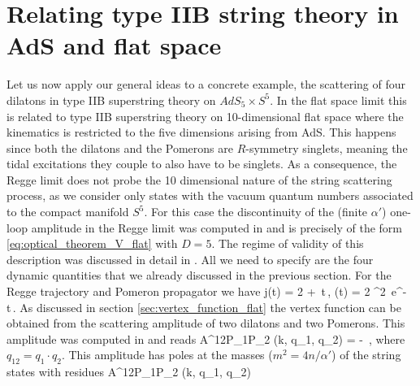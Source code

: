 
\section{Relating type IIB string theory in AdS and flat space}
\label{sec:IIB_AdS_flat}

Let us now apply our general ideas to a concrete example, the scattering of four dilatons in type IIB superstring theory on $AdS_5 \times S^5$. In the flat space limit this is related to
type IIB superstring theory on 10-dimensional flat space where the kinematics is restricted to the five dimensions arising from AdS. This happens since both the dilatons and the Pomerons are $R$-symmetry singlets, meaning the tidal excitations they couple to also have to be singlets.
As a consequence, the Regge limit does not probe the 10 dimensional nature of the string scattering process, as we consider only states with the vacuum quantum numbers associated to the compact manifold $S^5$.
 For this case the discontinuity of the (finite $\alpha'$) one-loop amplitude in the Regge limit was computed in \cite{Amati:1987uf} and is precisely of the form \eqref{eq:optical_theorem_V_flat} with $D=5$. The regime of validity of this description was discussed in detail in \cite{Amati:1987uf}.
All we need to specify are the four dynamic quantities that we already discussed in the previous section. For the Regge trajectory and Pomeron propagator we have
\beq
j(t) = 2 + \,t\,, \qquad
\beta(t) = 2 \pi^2 
		\,e^{-  t}\,.
\eeq
As discussed in section \ref{sec:vertex_function_flat} the vertex function can be obtained from the scattering amplitude of two dilatons and two Pomerons. This amplitude was computed in 
\cite{Amati:1987uf} and reads
	\beq
		A^{12P_1P_2} (k, q_1, q_2) = - \,,
		\label{eq:Aa1a2}
	\eeq
where $q_{12} = q_1\cdot q_2$.
This amplitude has poles at the masses ($m^2=4n/\alpha'$) of the string states with residues
	\beq
		 A^{12P_1P_2} (k, q_1, q_2)
